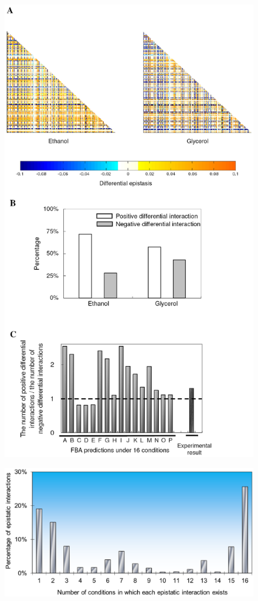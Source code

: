 \documentclass{article}
\begin{document}
\begin{figure}[H]
\caption{}
\label{fig:eef1}
\centering
\includegraphics[height=0.95\textheight]{envFigure_1}
\end{figure}

\setcounter{figure}{0}                           %
\makeatletter                                    %
\renewcommand{\thefigure}{S\@arabic\c@figure}    %
\makeatother                                     %

\begin{figure}[H]
\caption{}
\label{fig:eefS4}
\centering
\includegraphics[width=\textwidth]{envFigure_S4}
\end{figure}
\end{document}
